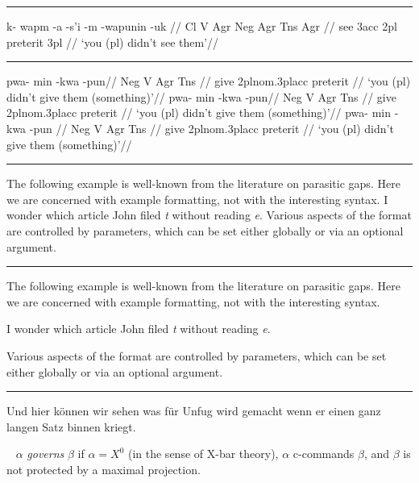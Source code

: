 \documentclass[12pt]{article}
\begin{document}
\filbreak\hrule\medskip

\begingroup
\ex
\begingl
\gla k- wapm -a -s'i -m -wapunin -uk //
\glb Cl V Agr Neg Agr Tns Agr //
 see {\sc 3acc} {} {\sc 2pl} preterit {\sc 3pl} //
\glft `you (pl) didn't see them'//
\endgl
\xe
\endgroup
\bigskip

\filbreak\hrule\medskip

\begingroup
\pex[interpartskip=3ex]
\a
\begingl
\gla pwa- min -kwa -pun//
\glb Neg V Agr Tns //
\glc {} give 2pl{\sc nom}.3pl{\sc acc} preterit //
\glft `you (pl) didn't give them (something)'//
\endgl
\a
\begingl[everygl=\openup.5ex,everygla=,everyglb=,
   everyglft=\it,aboveglftskip=1.5ex]
\gla pwa- min -kwa -pun//
\glb Neg V Agr Tns //
\glc {} give 2pl{\sc nom}.3pl{\sc acc} preterit //
\glft `you (pl) didn't give them (something)'//
\endgl
\a
\begingl[everygl=,everygla=\bf,everyglb=\it,
   everyglft=,aboveglftskip=0pt]
\gla pwa- min -kwa -pun //
\glb Neg V Agr Tns //
\glc {} give 2pl{\sc nom}.3pl{\sc acc} preterit //
\glft `you (pl) didn't give them (something)'//
\endgl
\xe
\endgroup
\bigskip

\filbreak\hrule\medskip

\begingroup
\exdisplay
The following example is well-known from the literature on
parasitic gaps.  Here we are concerned with example formatting,
not with the interesting syntax.
\ex
I wonder which article John filed {\sl t\/} without reading {\sl e}.
\xe
Various aspects of the format are controlled by parameters, which
can be set either globally or via an optional argument.
\xe
\endgroup
\bigskip

\filbreak\hrule\medskip

\begingroup
\exdisplay
The following example is well-known from the literature on
parasitic gaps.  Here we are concerned with example formatting,
not with the interesting syntax.

\ex[numoffset=2em,textoffset=.5em,aboveexskip=1ex,belowexskip=1ex]
I wonder which article John filed {\sl t\/} without reading {\sl e}.
\xe

\noindent Various aspects of the format are controlled by
parameters, which can be set either globally or via an optional
argument.
\xe
\endgroup
\bigskip

\filbreak\hrule\medskip

\begingroup
\ex
Und hier k\"onnen wir sehen was f\"ur Unfug wird gemacht
wenn er einen ganz langen Satz binnen kriegt.\par\nobreak
\xe

\ex~
$\alpha$ {\it governs\/} $\beta$ if $\alpha=X^0$ (in the
sense of X-bar theory), $\alpha$ c-commands $\beta$, and $\beta$
is not protected by a maximal projection.
\xe
\endgroup
\bigskip
\end{document}

